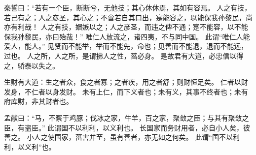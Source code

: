 \documentclass[twoside,openany]{book}
\begin{document}
\begin{pinyinscope}
秦誓曰：“若有一个臣，断断兮，无他技；其心休休焉，其如有容焉。
人之有技，若己有之；人之彦圣，其心之；不啻若自其口出，寔能容之，以能保我孙黎民，尚亦有利哉！
人之有技，媢嫉以之；人之彦圣，而违之俾不通；寔不能容，以不能保我孙黎民，亦曰殆哉！”
唯仁人放流之，诸四夷，不与同中国。
此谓“唯仁人能爱人，能人。”
见贤而不能举，举而不能先，命也；见善而不能退，退而不能远，过也。
人之所，人之所，是谓拂人之性，菑必身。
是故君有大道，必忠信以得之，骄泰以失之。

生财有大道：生之者众，食之者寡；之者疾，用之者舒；则财恒足矣。
仁者以财发身，不仁者以身发财。
未有上仁，而下义者也；未有义，其事不终者也；未有府库财，非其财者也。

孟献曰：“马，不察于鸡豚；伐冰之家，牛羊，百之家，聚敛之臣；与其有聚敛之臣，有盗臣。”
此谓国不以利利，以义利也。
长国家而务财用者，必自小人矣，彼善之。
小人之使国家，菑害并至，虽有善者，亦无如之何矣。
此谓“国不以利利，以义利”也。
\end{pinyinscope}
\end{document}
